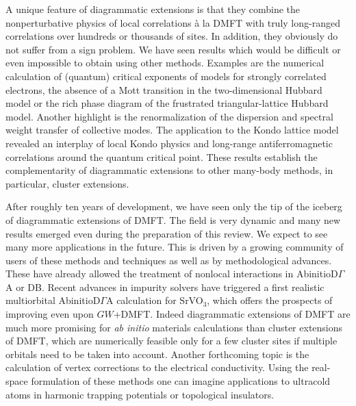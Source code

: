\documentclass[rmp,aps,reprint,amsmath,amssymb,superscriptaddress,showpacs,nofootinbib]{revtex4-1}
\begin{document}
A unique feature of diagrammatic extensions is that they combine the nonperturbative physics of local correlations \`a la DMFT with truly long-ranged correlations over hundreds or thousands of sites. In addition, they obviously do not suffer from a sign problem. We have seen results which would be difficult or even impossible to obtain using other methods. Examples are the numerical calculation of (quantum) critical exponents of models for strongly correlated electrons, the absence of a Mott transition in the two-dimensional Hubbard model or the rich phase diagram of the frustrated triangular-lattice Hubbard model. Another highlight is the renormalization of the dispersion and spectral weight transfer of collective modes. The application to the Kondo lattice model revealed an interplay of local Kondo physics and long-range antiferromagnetic correlations around the quantum critical point. These results establish the complementarity of diagrammatic extensions to other many-body methods, in particular, cluster extensions.

After roughly ten years of development, we have seen only the tip of the iceberg of diagrammatic extensions of DMFT. The field is very dynamic and many new results emerged even during the preparation of this review. We expect to see many more applications in the future. This is driven by a growing community of users of these methods and techniques as well as by methodological advances. These have already allowed the treatment of nonlocal interactions in AbinitioD$\Gamma$A or DB. Recent advances in impurity solvers have triggered a first realistic multiorbital  AbinitioD$\Gamma$A calculation  for SrVO$_3$, which offers the prospects of  improving even upon $GW$+DMFT. Indeed diagrammatic extensions of DMFT  are much more promising for {\em ab initio} materials calculations than cluster extensions of DMFT, which are numerically feasible only for a few cluster sites if multiple  orbitals need to be taken into account. Another forthcoming topic is the calculation of vertex corrections to the electrical conductivity. Using the real-space formulation of these methods one can imagine applications to ultracold atoms in harmonic trapping potentials or topological insulators.
\end{document}
